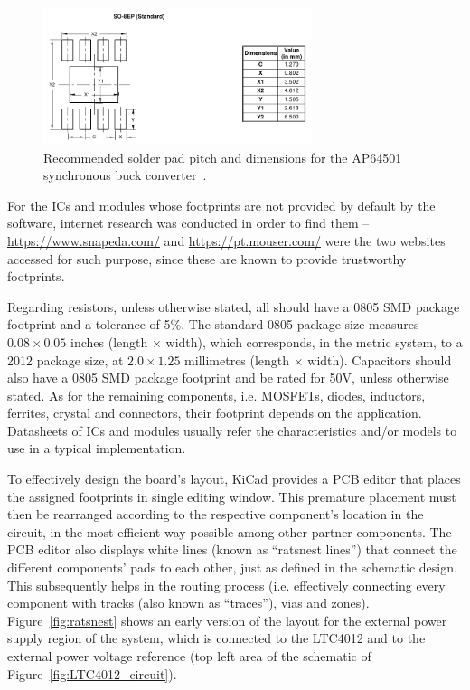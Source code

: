 \begin{figure}[h]
	\centering
	\includegraphics[width=0.7\textwidth]{Chapters/Figures/chapter5/footprint_AP64501.pdf}
	\caption{Recommended solder pad pitch and dimensions for the AP64501 synchronous buck converter~\cite{AP64501}.}
	\label{fig:footprint_AP64501}
\end{figure}

For the ICs and modules whose footprints are not provided by default by the software, internet research was conducted in order to find them -- \url{https://www.snapeda.com/} and \url{https://pt.mouser.com/} were the two websites accessed for such purpose, since these are known to provide trustworthy footprints.

Regarding resistors, unless otherwise stated, all should have a 0805 \gls{SMD} package footprint and a tolerance of 5\%. The standard 0805 package size measures $0.08 \times 0.05$ inches (length $\times$ width), which corresponds, in the metric system, to a 2012 package size, at $2.0 \times 1.25$ millimetres (length $\times$ width).
Capacitors should also have a 0805 SMD package footprint and be rated for 50V, unless otherwise stated.
As for the remaining components, i.e. MOSFETs, diodes, inductors, ferrites, crystal and connectors, their footprint depends on the application.
Datasheets of ICs and modules usually refer the characteristics and/or models to use in a typical implementation.

To effectively design the board's layout, KiCad provides a PCB editor that places the assigned footprints in single editing window. This premature placement must then be rearranged according to the respective component's location in the circuit, in the most efficient way possible among other partner components. The PCB editor also displays white lines (known as ``ratsnest lines'') that connect the different components' pads to each other, just as defined in the schematic design. This subsequently helps in the routing process (i.e. effectively connecting every component with tracks (also known as ``traces''), vias and zones). Figure~\ref{fig:ratsnest} shows an early version of the layout for the external power supply region of the system, which is connected to the LTC4012 and to the external power voltage reference (top left area of the schematic of Figure~\ref{fig:LTC4012_circuit}).

